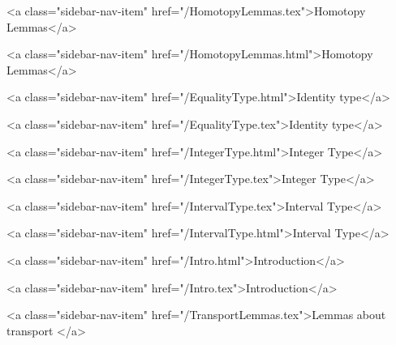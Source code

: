       
        
          <a class="sidebar-nav-item" href="/HomotopyLemmas.tex">Homotopy Lemmas</a>
        
      
    
      
        
          <a class="sidebar-nav-item" href="/HomotopyLemmas.html">Homotopy Lemmas</a>
        
      
    
      
        
          <a class="sidebar-nav-item" href="/EqualityType.html">Identity type</a>
        
      
    
      
        
          <a class="sidebar-nav-item" href="/EqualityType.tex">Identity type</a>
        
      
    
      
        
          <a class="sidebar-nav-item" href="/IntegerType.html">Integer Type</a>
        
      
    
      
        
          <a class="sidebar-nav-item" href="/IntegerType.tex">Integer Type</a>
        
      
    
      
        
          <a class="sidebar-nav-item" href="/IntervalType.tex">Interval Type</a>
        
      
    
      
        
          <a class="sidebar-nav-item" href="/IntervalType.html">Interval Type</a>
        
      
    
      
        
          <a class="sidebar-nav-item" href="/Intro.html">Introduction</a>
        
      
    
      
        
          <a class="sidebar-nav-item" href="/Intro.tex">Introduction</a>
        
      
    
      
        
          <a class="sidebar-nav-item" href="/TransportLemmas.tex">Lemmas about transport </a>
        
      
    
